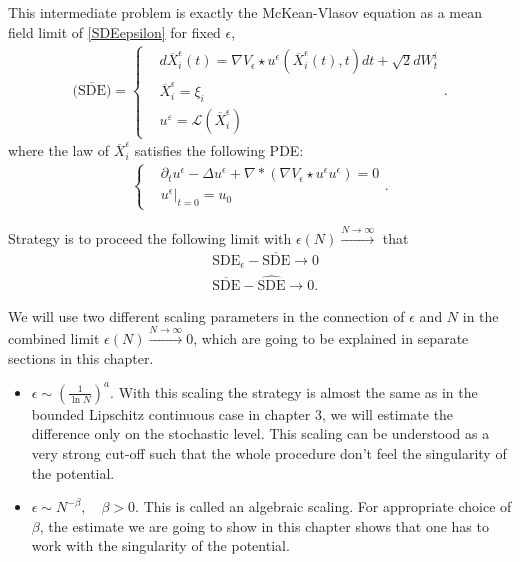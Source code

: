 This intermediate problem is exactly the McKean-Vlasov equation as a mean field limit of \autoref{SDEepsilon} for fixed $\epsilon$,
\begin{align}  \label{SDEbar}
\overline{\text{(SDE)}}=\begin{cases}
&d \overline{X}_i^{\epsilon} (t)= \nabla V_{\epsilon} \star  u^{\epsilon} (\overline{X}^{\epsilon}_i(t),t )  dt + \sqrt{2}dW_t^i\\
&\overline{X}^{\epsilon}_i = \xi_i \\
&u^\varepsilon = \mathcal{L}(\overline{X}_i^\epsilon )
\end{cases}
.\end{align}
where the law of $\overline{X}^{\epsilon}_i$ satisfies the following PDE:
\begin{align}\label{epsPDE}
  \begin{cases}
  &\partial_t u^{\epsilon}  - \Delta  u^{\epsilon} + \nabla* (\nabla V_\epsilon \star  u^{\epsilon}  u^{\epsilon} ) = 0 \\
  &u^{\epsilon}  \rvert_{t=0} = u_{0}
  \end{cases}
.\end{align}

Strategy is to proceed the following limit with $\epsilon(N) \xrightarrow{N\to \infty}$ that
\begin{align*}
 &\text{SDE}_\epsilon - \overline{\text{SDE}} \to 0 \\ 
                                                  &\overline{\text{SDE}} - \widehat{\text{SDE}} \to 0
.\end{align*}

We will use two different scaling parameters in the connection of $\epsilon$ and $N$ in the combined limit $\epsilon(N) \xrightarrow{N\to \infty} 0$, which are going to be explained in separate sections in this chapter.
\begin{itemize}
	\item $\epsilon \sim (\frac{1}{\ln N})^{a}$. With this scaling the strategy is almost the same as in the bounded Lipschitz continuous case in chapter 3, we will estimate the difference only on the stochastic level. This scaling can be understood as a very strong cut-off such that the whole procedure don't feel the singularity of the potential. 
	\item $\epsilon \sim N^{-\beta },  \quad \beta  > 0$. This is called an algebraic scaling. For appropriate choice of $\beta$, the estimate we are going to show in this chapter shows that one has to work with the singularity of the potential.
\end{itemize}


